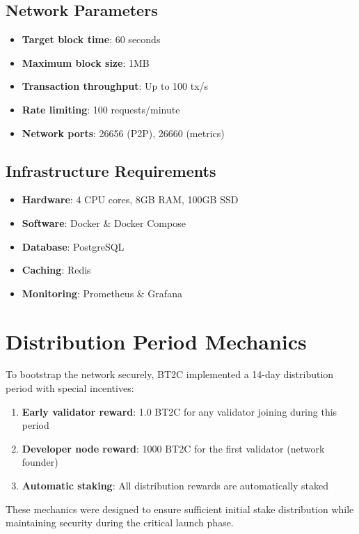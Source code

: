 \documentclass[10pt,a4paper]{article}
\begin{document}
\subsection{Network Parameters}
\begin{itemize}
\item \textbf{Target block time}: 60 seconds
\item \textbf{Maximum block size}: 1MB
\item \textbf{Transaction throughput}: Up to 100 tx/s
\item \textbf{Rate limiting}: 100 requests/minute
\item \textbf{Network ports}: 26656 (P2P), 26660 (metrics)
\end{itemize}

\subsection{Infrastructure Requirements}
\begin{itemize}
\item \textbf{Hardware}: 4 CPU cores, 8GB RAM, 100GB SSD
\item \textbf{Software}: Docker \& Docker Compose
\item \textbf{Database}: PostgreSQL
\item \textbf{Caching}: Redis
\item \textbf{Monitoring}: Prometheus \& Grafana
\end{itemize}

\section{Distribution Period Mechanics}
To bootstrap the network securely, BT2C implemented a 14-day distribution period with special incentives:

\begin{enumerate}
\item \textbf{Early validator reward}: 1.0 BT2C for any validator joining during this period
\item \textbf{Developer node reward}: 1000 BT2C for the first validator (network founder)
\item \textbf{Automatic staking}: All distribution rewards are automatically staked
\end{enumerate}

These mechanics were designed to ensure sufficient initial stake distribution while maintaining security during the critical launch phase.
\end{document}
